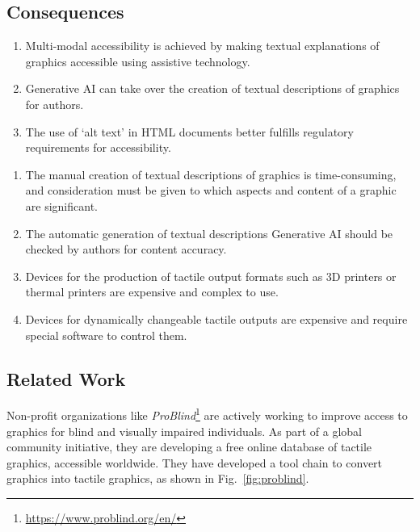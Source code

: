 \subsection*{Consequences}

\renewcommand{\labelenumi}{$+$}
\begin{enumerate}
\item Multi-modal accessibility is achieved by making textual explanations of graphics accessible using assistive technology. 

\item Generative AI can take over the creation of textual descriptions of graphics for authors.

\item The use of ‘alt text’ in HTML documents better fulfills regulatory requirements for accessibility. 


\end{enumerate}

\renewcommand{\labelenumi}{$-$}
\begin{enumerate}
\item The manual creation of textual descriptions of graphics is time-consuming, and consideration must be given to which aspects and content of a graphic are significant.

\item The automatic generation of textual descriptions Generative AI should be checked by authors for content accuracy.

\item Devices for the production of tactile output formats such as 3D printers or thermal printers are expensive and complex to use.

\item Devices for dynamically changeable tactile outputs are expensive and require special software to control them. 
\end{enumerate}

 
\subsection*{Related Work}

Non-profit organizations like \textit{ProBlind}\footnote{\url{https://www.problind.org/en/}} are actively working to improve access to graphics for blind and visually impaired individuals. As part of a global community initiative, they are developing a free online database of tactile graphics, accessible worldwide. They have developed a tool chain to convert graphics into tactile graphics, as shown in Fig.~\ref{fig:problind}.

